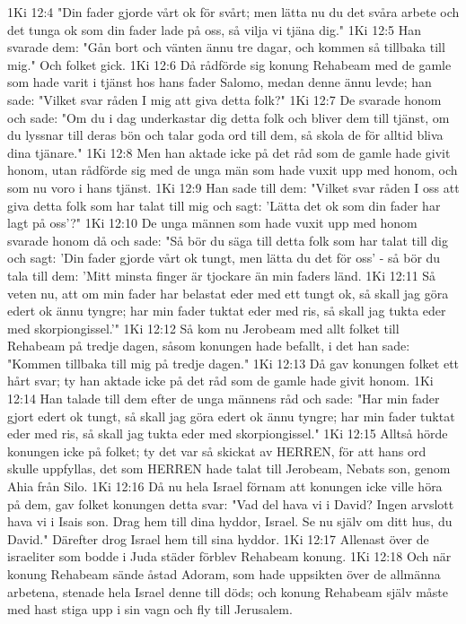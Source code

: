1Ki 12:4  "Din fader gjorde vårt ok för svårt; men lätta nu du det svåra arbete och det tunga ok som din fader lade på oss, så vilja vi tjäna dig."
1Ki 12:5  Han svarade dem: "Gån bort och vänten ännu tre dagar, och kommen så tillbaka till mig." Och folket gick.
1Ki 12:6  Då rådförde sig konung Rehabeam med de gamle som hade varit i tjänst hos hans fader Salomo, medan denne ännu levde; han sade: "Vilket svar råden I mig att giva detta folk?"
1Ki 12:7  De svarade honom och sade: "Om du i dag underkastar dig detta folk och bliver dem till tjänst, om du lyssnar till deras bön och talar goda ord till dem, så skola de för alltid bliva dina tjänare."
1Ki 12:8  Men han aktade icke på det råd som de gamle hade givit honom, utan rådförde sig med de unga män som hade vuxit upp med honom, och som nu voro i hans tjänst.
1Ki 12:9  Han sade till dem: "Vilket svar råden I oss att giva detta folk som har talat till mig och sagt: 'Lätta det ok som din fader har lagt på oss'?"
1Ki 12:10  De unga männen som hade vuxit upp med honom svarade honom då och sade: "Så bör du säga till detta folk som har talat till dig och sagt: 'Din fader gjorde vårt ok tungt, men lätta du det för oss' - så bör du tala till dem: 'Mitt minsta finger är tjockare än min faders länd.
1Ki 12:11  Så veten nu, att om min fader har belastat eder med ett tungt ok, så skall jag göra edert ok ännu tyngre; har min fader tuktat eder med ris, så skall jag tukta eder med skorpiongissel.'"
1Ki 12:12  Så kom nu Jerobeam med allt folket till Rehabeam på tredje dagen, såsom konungen hade befallt, i det han sade: "Kommen tillbaka till mig på tredje dagen."
1Ki 12:13  Då gav konungen folket ett hårt svar; ty han aktade icke på det råd som de gamle hade givit honom.
1Ki 12:14  Han talade till dem efter de unga männens råd och sade: "Har min fader gjort edert ok tungt, så skall jag göra edert ok ännu tyngre; har min fader tuktat eder med ris, så skall jag tukta eder med skorpiongissel."
1Ki 12:15  Alltså hörde konungen icke på folket; ty det var så skickat av HERREN, för att hans ord skulle uppfyllas, det som HERREN hade talat till Jerobeam, Nebats son, genom Ahia från Silo.
1Ki 12:16  Då nu hela Israel förnam att konungen icke ville höra på dem, gav folket konungen detta svar: "Vad del hava vi i David? Ingen arvslott hava vi i Isais son. Drag hem till dina hyddor, Israel. Se nu själv om ditt hus, du David." Därefter drog Israel hem till sina hyddor.
1Ki 12:17  Allenast över de israeliter som bodde i Juda städer förblev Rehabeam konung.
1Ki 12:18  Och när konung Rehabeam sände åstad Adoram, som hade uppsikten över de allmänna arbetena, stenade hela Israel denne till döds; och konung Rehabeam själv måste med hast stiga upp i sin vagn och fly till Jerusalem.
